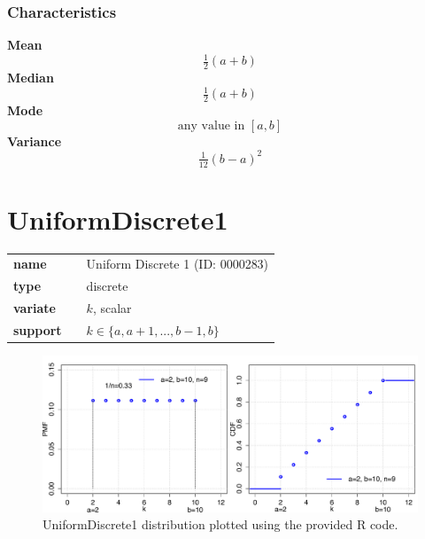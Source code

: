 \subsubsection*{Characteristics}
\smallskip \noindent \hspace{.2cm} \textbf{Mean} 
\begin{equation*}\tfrac{1}{2}(a+b)\end{equation*}
\smallskip \noindent \hspace{.2cm} \textbf{Median} 
\begin{equation*}\tfrac{1}{2}(a+b)\end{equation*}
\smallskip \noindent \hspace{.2cm} \textbf{Mode} 
\begin{equation*}\text{any value in }[a,b]\end{equation*}
\smallskip \noindent \hspace{.2cm} \textbf{Variance} 
\begin{equation*}\tfrac{1}{12} (b-a)^2\end{equation*}
\smallskip
\section*{UniformDiscrete1} 

  \bigskip 

\begin{tabular}{p{2cm}cl}
\textbf{name} & & Uniform Discrete 1 (ID: 0000283)\\ 
 
\textbf{type} & & discrete \\ 

\textbf{variate} & & $k$, scalar \\ 

\textbf{support} & & $k \in \{a,a+1,...,b-1,b\}$
\end{tabular}

\begin{figure}[ht!]
\centering
  \includegraphics[width=140mm]{pics/UniformDiscrete1.pdf}
 \caption{UniformDiscrete1 distribution plotted using the provided R code.}
 \label{fig:UniformDiscrete1}
\end{figure}

